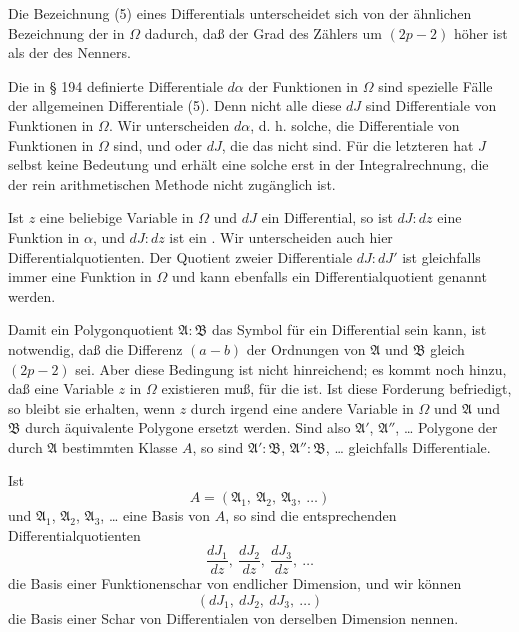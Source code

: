 
Die Bezeichnung (5) eines Differentials unterscheidet sich von
der ähnlichen Bezeichnung der  in $\Omega$ dadurch, daß
der Grad des Zählers um $(2p - 2)$ höher ist als der des Nenners.

Die in § 194 definierte Differentiale $d\alpha$ der Funktionen in
$\Omega$ sind spezielle Fälle der allgemeinen Differentiale (5). Denn
nicht alle diese $dJ$ sind Differentiale von Funktionen in $\Omega$.
Wir unterscheiden  $d\alpha$, d. h. solche,
die Differentiale von Funktionen in $\Omega$ sind, und 
oder  $dJ$, die das nicht sind. Für die
letzteren hat $J$ selbst keine Bedeutung und erhält eine solche
erst in der Integralrechnung, die der rein arithmetischen Methode
nicht zugänglich ist.

Ist $z$ eine beliebige Variable in $\Omega$ und $dJ$ ein Differential,
so ist $dJ:dz$ eine Funktion in $\alpha$,
und $dJ:dz$ ist ein .
Wir unterscheiden auch hier 
Differentialquotienten. Der Quotient zweier Differentiale $dJ:dJ'$
ist gleichfalls immer eine Funktion in $\Omega$ und kann ebenfalls
ein Differentialquotient genannt werden.

Damit ein Polygonquotient $\mathfrak{A}:\mathfrak{B}$ das Symbol für ein Differential
sein kann, ist notwendig, daß die Differenz $(a - b)$ der Ordnungen von
$\mathfrak{A}$ und $\mathfrak{B}$ gleich $(2p - 2)$ sei. Aber diese Bedingung ist nicht
hinreichend; es kommt noch hinzu, daß eine Variable $z$ in $\Omega$
existieren muß, für die
ist. Ist diese Forderung befriedigt, so bleibt sie erhalten, wenn
$z$ durch irgend eine andere Variable in $\Omega$ und $\mathfrak{A}$ und $\mathfrak{B}$ durch
äquivalente Polygone ersetzt werden. Sind also $\mathfrak{A}'$, $\mathfrak{A}''$, \dots{} Poly\-gone
der durch $\mathfrak{A}$ bestimmten Klasse $A$, so sind $\mathfrak{A}':\mathfrak{B}$, $\mathfrak{A}'':\mathfrak{B}$, \dots{}
gleichfalls Differentiale.

Ist
\[ A = (\mathfrak{A}_1,\ \mathfrak{A}_2,\ \mathfrak{A}_3,\ \dots) \]
und $\mathfrak{A}_1$, $\mathfrak{A}_2$, $\mathfrak{A}_3$, \dots{} eine Basis von $A$, so sind die entsprechenden
Differentialquotienten
\[ \frac{dJ_1}{dz},\ \frac{dJ_2}{dz},\ \frac{dJ_3}{dz},\ \dots \]
die Basis einer Funktionenschar von endlicher Dimension, und wir
können
\[ (dJ_1,\ dJ_2,\ dJ_3,\ \dots) \]
die Basis einer Schar von Differentialen von derselben Dimension
nennen.
